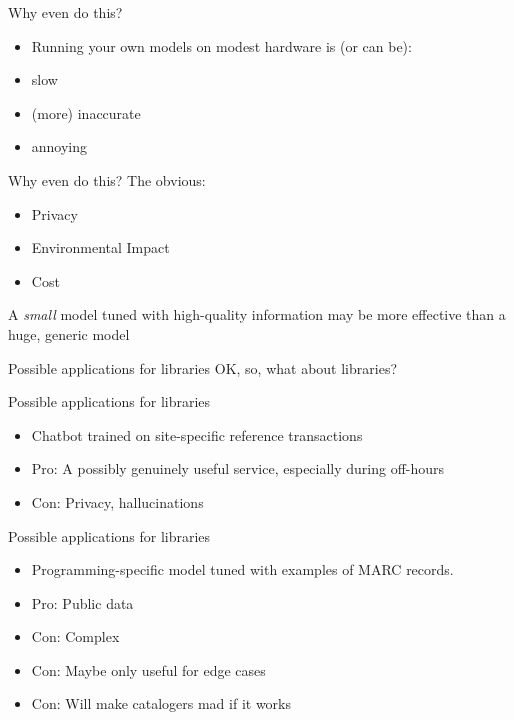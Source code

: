 \documentclass{beamer}
\begin{document}
\begin{frame}{Why even do this?}
\begin{itemize}
	\item Running your own models on modest hardware is (or can be):
	\pause
	\item slow
	\pause
	\item (more) inaccurate
	\pause
	\item annoying
\end{itemize}  
\end{frame}

\begin{frame}{Why even do this?}
	The obvious:
	\begin{itemize}
		\item Privacy
		\pause
		\item Environmental Impact
		\pause 
		\item Cost
		
	\end{itemize}
\end{frame}


\begin{frame}
	A \textit{small} model tuned with high-quality information may be more effective than a huge, generic model
\end{frame}


\begin{frame}{Possible applications for libraries}
	OK, so, what about libraries?
\end{frame}

\begin{frame}{Possible applications for libraries}
	\begin{itemize}
		\item Chatbot trained on site-specific reference transactions
		\pause
		\item Pro: A possibly genuinely useful service, especially during off-hours
		\pause
		\item Con: Privacy, hallucinations
	\end{itemize}
\end{frame}

\begin{frame}{Possible applications for libraries}
	\begin{itemize}
		\item Programming-specific model tuned with examples of MARC records.
		\pause
		\item Pro: Public data
		\pause
		\item Con: Complex
		\pause
		\item Con: Maybe only useful for edge cases
		\pause
		\item Con: Will make catalogers mad if it works
	\end{itemize}
\end{frame}
\end{document}
